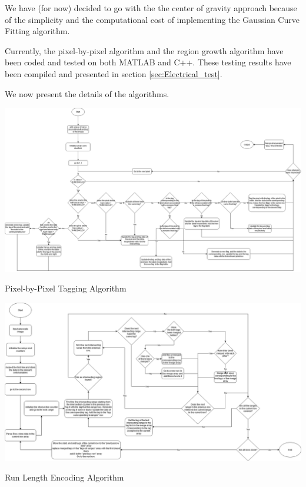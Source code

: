 \documentclass[../../main.tex]{subfiles}
\begin{document}
We have (for now) decided to go with the the center of gravity approach because of the simplicity and the computational cost of implementing the Gaussian Curve Fitting algorithm.

Currently, the pixel-by-pixel algorithm and the region growth algorithm have been coded and tested on both MATLAB and C++. These testing results have been compiled and presented in section \ref{sec:Electrical_test}.

We now present the details of the algorithms.





\begin{Flowchart}
    \centering
    \includegraphics[width=\textwidth]{Figures/Electrical/centroiding_2_non_coding.png}
    \caption{Pixel-by-Pixel Tagging Algorithm}
    \label{FC:pbp_centroiding}
\end{Flowchart}


\begin{Flowchart}
    \centering
    \includegraphics[width = \textwidth]{Figures/Electrical/centroiding_3_non_coding.png}
    \caption{Run Length Encoding Algorithm}
    \label{FC:flow_fe_rle}
\end{Flowchart}
\end{document}
